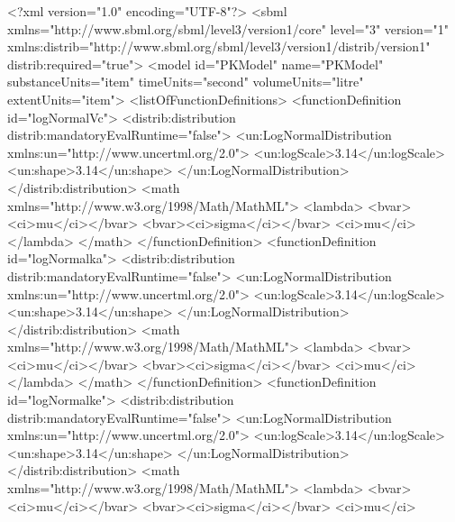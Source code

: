 \documentclass[draftspec]{sbmlpkgspec}
\begin{document}
\begin{example}
<?xml version="1.0" encoding="UTF-8"?>
<sbml xmlns="http://www.sbml.org/sbml/level3/version1/core" level="3" version="1"
    xmlns:distrib="http://www.sbml.org/sbml/level3/version1/distrib/version1" 
    distrib:required="true">
    <model id="PKModel" name="PKModel" substanceUnits="item"
          timeUnits="second" volumeUnits="litre" extentUnits="item">
        <listOfFunctionDefinitions>
            <functionDefinition id="logNormalVc">
                <distrib:distribution distrib:mandatoryEvalRuntime="false">
                    <un:LogNormalDistribution xmlns:un="http://www.uncertml.org/2.0">
                        <un:logScale>3.14</un:logScale>
                        <un:shape>3.14</un:shape>
                    </un:LogNormalDistribution>
                </distrib:distribution>
                <math xmlns="http://www.w3.org/1998/Math/MathML">
                    <lambda>
                        <bvar><ci>mu</ci></bvar>
                        <bvar><ci>sigma</ci></bvar> 
                        <ci>mu</ci>                         
                    </lambda>
                </math>
            </functionDefinition>
            <functionDefinition id="logNormalka">
                <distrib:distribution distrib:mandatoryEvalRuntime="false">
                    <un:LogNormalDistribution xmlns:un="http://www.uncertml.org/2.0">
                        <un:logScale>3.14</un:logScale>
                        <un:shape>3.14</un:shape>
                    </un:LogNormalDistribution>
                </distrib:distribution>
                <math xmlns="http://www.w3.org/1998/Math/MathML">
                    <lambda>
                        <bvar><ci>mu</ci></bvar>
                        <bvar><ci>sigma</ci></bvar> 
                        <ci>mu</ci>                         
                    </lambda>
                </math>
            </functionDefinition>      
            <functionDefinition id="logNormalke">
                <distrib:distribution distrib:mandatoryEvalRuntime="false">
                    <un:LogNormalDistribution xmlns:un="http://www.uncertml.org/2.0">
                        <un:logScale>3.14</un:logScale>
                        <un:shape>3.14</un:shape>
                    </un:LogNormalDistribution>
                </distrib:distribution>
                <math xmlns="http://www.w3.org/1998/Math/MathML">
                    <lambda>
                        <bvar><ci>mu</ci></bvar>
                        <bvar><ci>sigma</ci></bvar> 
                        <ci>mu</ci>                         

\end{example}
\end{document}
